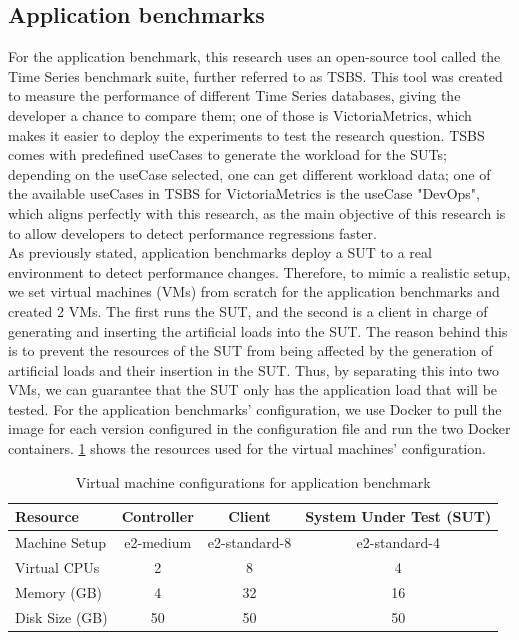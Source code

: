 \subsection{Application benchmarks}
For the application benchmark, this research uses an open-source tool called the Time Series benchmark suite, further referred to as \ac{TSBS}. This tool was created to measure the performance of different Time Series databases, giving the developer a chance to compare them; one of those is VictoriaMetrics, which makes it easier to deploy the experiments to test the research question. \ac{TSBS} comes with predefined useCases to generate the workload for the \ac{SUT}s; depending on the useCase selected, one can get different workload data; one of the available useCases in \ac{TSBS} for VictoriaMetrics is the useCase "DevOps", which aligns perfectly with this research, as the main objective of this research is to allow developers to detect performance regressions faster. \\
As previously stated, application benchmarks deploy a \ac{SUT} to a real environment to detect performance changes. Therefore, to mimic a realistic setup, we set virtual machines (\ac{VM}s) from scratch for the application benchmarks and created 2 \ac{VM}s. The first runs the \ac{SUT},  and the second is a client in charge of generating and inserting the artificial loads into the \ac{SUT}. The reason behind this is to prevent the resources of the \ac{SUT} from being affected by the generation of artificial loads and their insertion in the \ac{SUT}. Thus, by separating this into two \ac{VM}s, we can guarantee that the \ac{SUT} only has the application load that will be tested. For the application benchmarks’ configuration, we use Docker to pull the image for each version configured in the configuration file and run the two Docker containers. \cref{tab:vm_configurations} shows the resources used for the virtual machines' configuration. \\
\begin{table}[ht]
    \centering
    \begin{tabular}{lccc}
        \toprule
        \textbf{Resource} & \textbf{Controller} & \textbf{Client} & \textbf{System Under Test (SUT)} \\
        \midrule
        Machine Setup & e2-medium & e2-standard-8 & e2-standard-4 \\
        Virtual CPUs & 2 & 8 & 4 \\
        Memory (GB) & 4 & 32 & 16 \\
        Disk Size (GB) & 50 & 50 & 50 \\
        \bottomrule
    \end{tabular}
    \caption{Virtual machine configurations for application benchmark}
    \label{tab:vm_configurations}
\end{table}
